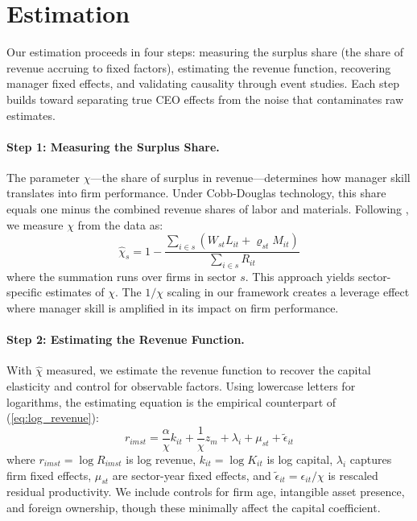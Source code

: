 \documentclass[11pt,a4paper]{article}
\begin{document}



\section{Estimation}

Our estimation proceeds in four steps: measuring the surplus share (the share of revenue accruing to fixed factors), estimating the revenue function, recovering manager fixed effects, and validating causality through event studies. Each step builds toward separating true CEO effects from the noise that contaminates raw estimates.

\paragraph{Step 1: Measuring the Surplus Share.} The parameter $\chi$---the share of surplus in revenue---determines how manager skill translates into firm performance. Under Cobb-Douglas technology, this share equals one minus the combined revenue shares of labor and materials. Following \citet{Gandhi2020-nu}, we measure $\chi$ from the data as:
\begin{equation}
\hat{\chi}_s = 1 - \frac{\sum_{i \in s}(W_{st}L_{it} + \varrho_{st}M_{it})}{\sum_{i \in s} R_{it}}
\end{equation}
where the summation runs over firms in sector $s$. This approach yields sector-specific estimates of $\chi$. The $1/\chi$ scaling in our framework creates a leverage effect where manager skill is amplified in its impact on firm performance.

\paragraph{Step 2: Estimating the Revenue Function.} With $\hat{\chi}$ measured, we estimate the revenue function to recover the capital elasticity and control for observable factors. Using lowercase letters for logarithms, the estimating equation is the empirical counterpart of (\ref{eq:log_revenue}):
\begin{equation}
r_{imst} = \frac{\alpha}{\chi} k_{it} + \frac{1}{\chi}z_m + \lambda_i + \mu_{st} + \tilde{\epsilon}_{it}
\end{equation}
where $r_{imst} = \log R_{imst}$ is log revenue, $k_{it} = \log K_{it}$ is log capital, $\lambda_i$ captures firm fixed effects, $\mu_{st}$ are sector-year fixed effects, and $\tilde{\epsilon}_{it} = \epsilon_{it}/\chi$ is rescaled residual productivity. We include controls for firm age, intangible asset presence, and foreign ownership, though these minimally affect the capital coefficient.
\end{document}
